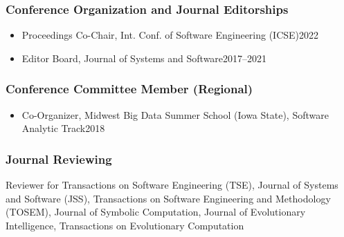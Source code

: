 \documentclass[11pt]{article}
\begin{document}
\subsubsection{Conference Organization and Journal Editorships}
\begin{itemize}
    \item Proceedings Co-Chair,  Int. Conf. of Software Engineering (ICSE)\hfill 2022
    \item Editor Board, Journal of Systems and Software\hfill 2017--2021
\end{itemize}

\subsubsection{Conference Committee Member (Regional)}

\begin{itemize}
    \item Co-Organizer, Midwest Big Data Summer School (Iowa State), Software Analytic Track\hfill 2018
\end{itemize}


\subsubsection{Journal Reviewing}
\begin{description}
    \item Reviewer for  Transactions on Software Engineering (TSE), Journal of Systems and Software (JSS), Transactions on Software Engineering and Methodology (TOSEM), Journal of Symbolic Computation, Journal of Evolutionary Intelligence, Transactions on Evolutionary Computation
\end{description}
\end{document}
